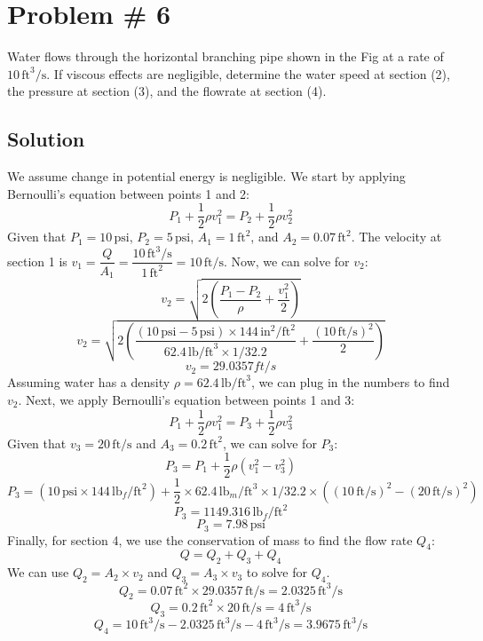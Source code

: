 \documentclass{article}
\begin{document}
\newpage
\section*{Problem \# 6}

Water flows through the horizontal branching pipe shown in the Fig at a rate of \(10 \, \text{ft}^3/\text{s}\). If viscous effects are negligible, determine the water speed at section (2), the pressure at section (3), and the flowrate at section (4).

\subsection*{Solution}
We assume change in potential energy is negligible. \newline
We start by applying Bernoulli's equation between points 1 and 2:
\[
P_1 + \frac{1}{2} \rho v_1^2 = P_2 + \frac{1}{2} \rho v_2^2
\]
Given that \(P_1 = 10 \, \text{psi}\), \(P_2 = 5 \, \text{psi}\), \(A_1 = 1 \, \text{ft}^2\), and \(A_2 = 0.07 \, \text{ft}^2\).
\newline
The velocity at section 1 is \(v_1 = \dfrac{Q}{A_1} = \dfrac{10 \, \text{ft}^3/\text{s}}{1 \, \text{ft}^2} = 10 \, \text{ft/s}\).
\newline
Now, we can solve for \(v_2\):
\[
v_2 = \sqrt{2 \left( \frac{P_1 - P_2}{\rho} + \frac{v_1^2}{2} \right)}
\]
\[
v_2 = \sqrt{2 \left( \frac{(10 \, \text{psi} - 5 \, \text{psi}) \times 144 \, \text{in}^2/\text{ft}^2}{62.4 \, \text{lb/ft}^3 \times 1/32.2 } + \frac{(10 \, \text{ft/s})^2}{2} \right)}
\]
\[
v_2 = 29.0357 ft/s
\]
Assuming water has a density \(\rho = 62.4 \, \text{lb/ft}^3\), we can plug in the numbers to find \(v_2\).
\newline\newline
Next, we apply Bernoulli's equation between points 1 and 3:
\[
P_1 + \frac{1}{2} \rho v_1^2 = P_3 + \frac{1}{2} \rho v_3^2
\]
Given that \(v_3 = 20 \, \text{ft/s}\) and \(A_3 = 0.2 \, \text{ft}^2\), we can solve for \(P_3\):
\[
P_3 = P_1 + \frac{1}{2} \rho \left( v_1^2 - v_3^2 \right)
\]
\[
P_3 = (10 \, \text{psi} \times 144 \, \text{lb}_f/\text{ft}^2) + \frac{1}{2} \times 62.4 \, \text{lb}_m/\text{ft}^3 \times 1/32.2 \times \left( (10 \, \text{ft/s})^2 - (20 \, \text{ft/s})^2 \right)
\]
\[
P_3 = 1149.316 \, \text{lb}_f/\text{ft}^2
\]
\[
P_3 = 7.98 \, \text{psi}
\]
Finally, for section 4, we use the conservation of mass to find the flow rate \( Q_4 \):
\[
Q = Q_2 + Q_3 + Q_4
\]
We can use \( Q_2 = A_2 \times v_2 \) and \( Q_3 = A_3 \times v_3 \) to solve for \( Q_4 \).
\[
Q_2 = 0.07 \, \text{ft}^2 \times 29.0357 \, \text{ft/s} = 2.0325 \, \text{ft}^3/\text{s}
\]
\[
Q_3 = 0.2 \, \text{ft}^2 \times 20 \, \text{ft/s} = 4 \, \text{ft}^3/\text{s}
\]
\[
Q_4 = 10 \, \text{ft}^3/\text{s} - 2.0325 \, \text{ft}^3/\text{s} - 4 \, \text{ft}^3/\text{s} = 3.9675 \, \text{ft}^3/\text{s}
\]
\end{document}
